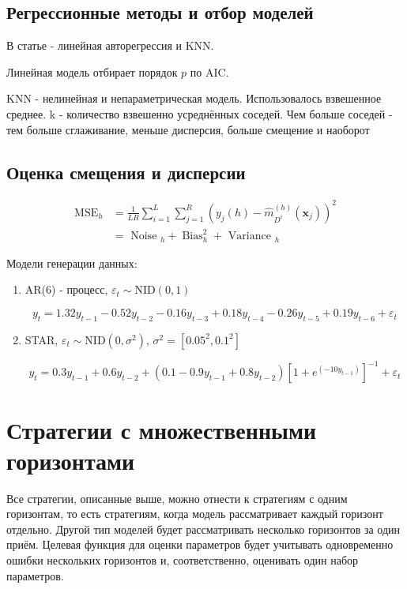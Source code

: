 \documentclass[a4paper,12pt]{article}
\begin{document}
\subsection{Регрессионные методы и отбор моделей}

В статье - линейная авторегрессия и KNN.

Линейная модель отбирает порядок $ p $ по AIC.

KNN - нелинейная и непараметрическая модель. Использовалось взвешенное среднее. k - количество взвешенно усреднённых соседей. Чем больше соседей - тем больше сглаживание, меньше дисперсия, больше смещение и наоборот

\subsection{Оценка смещения и дисперсии}

\[
\begin{aligned} \mathrm{MSE}_{h} &=\frac{1}{L R} \sum_{i=1}^{L} \sum_{j=1}^{R}\left(y_{j}(h)-\hat{m}_{D^{i}}^{(h)}\left(\boldsymbol{x}_{j}\right)\right)^{2} \\ &=\text { Noise }_{h}+\operatorname{Bias}_{h}^{2}+\text { Variance }_{h} \end{aligned}
\]

Модели генерации данных:

\begin{enumerate}[\Sun]
	\item AR(6) - процесс, 	$\varepsilon_{t} \sim \mathrm{NID}(0,1)$
	
	\[
	y_{t}=1.32 y_{t-1}-0.52 y_{t-2}-0.16 y_{t-3}+0.18 y_{t-4}-0.26 y_{t-5}+0.19 y_{t-6}+\varepsilon_{t}
	\]
	
	\item STAR, $\varepsilon_{t} \sim \mathrm{NID}\left(0, \sigma^{2}\right)$, $\sigma^{2}=\left[0.05^{2}, 0.1^{2}\right]$
	
	\[
	y_{t}=0.3 y_{t-1}+0.6 y_{t-2}+\left(0.1-0.9 y_{t-1}+0.8 y_{t-2}\right)\left[1+e^{\left(-10 y_{t-1}\right)}\right]^{-1}+\varepsilon_{t}
	\]

\end{enumerate}


\section{Стратегии с множественными горизонтами}

Все стратегии, описанные выше, можно отнести к стратегиям с одним горизонтам, то есть стратегиям, когда модель рассматривает каждый горизонт отдельно. Другой тип моделей будет рассматривать несколько горизонтов за один приём. Целевая функция для оценки параметров будет учитывать одновременно ошибки нескольких горизонтов и, соответственно, оценивать один набор параметров.
\end{document}
